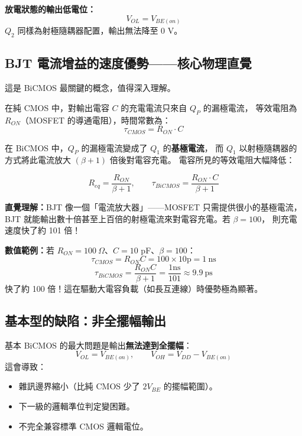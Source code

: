 \documentclass[12pt]{article}
\begin{document}
\begin{formulabox}
\textbf{放電狀態的輸出低電位：}
\[
V_{OL} = V_{BE(on)}
\]
$Q_2$ 同樣為射極隨耦器配置，輸出無法降至 0 V。
\end{formulabox}

\subsection*{BJT 電流增益的速度優勢——核心物理直覺}

\begin{keybox}
這是 BiCMOS 最關鍵的概念，值得深入理解。

在純 CMOS 中，對輸出電容 $C$ 的充電電流只來自 $Q_P$ 的漏極電流，
等效電阻為 $R_{ON}$（MOSFET 的導通電阻），時間常數為：
\[
\tau_{CMOS} = R_{ON} \cdot C
\]

在 BiCMOS 中，$Q_P$ 的漏極電流變成了 $Q_1$ 的\textbf{基極電流}，
而 $Q_1$ 以射極隨耦器的方式將此電流放大 $(\beta+1)$ 倍後對電容充電。
電容所見的等效電阻大幅降低：

\begin{formulabox}
\[
R_{eq} = \frac{R_{ON}}{\beta+1},\qquad
\tau_{BiCMOS} = \frac{R_{ON} \cdot C}{\beta+1}
\]
\end{formulabox}

\textbf{直覺理解：}BJT 像一個「電流放大器」——MOSFET 只需提供很小的基極電流，
BJT 就能輸出數十倍甚至上百倍的射極電流來對電容充電。若 $\beta = 100$，
則充電速度快了約 101 倍！

\textbf{數值範例：}若 $R_{ON} = 100\ \Omega$、$C = 10$ pF、$\beta = 100$：
\[
\tau_{CMOS} = R_{ON}C = 100 \times 10\text{p} = 1\ \text{ns}
\]
\[
\tau_{BiCMOS} = \frac{R_{ON}C}{\beta+1} = \frac{1\text{ns}}{101} \approx 9.9\ \text{ps}
\]
快了約 100 倍！這在驅動大電容負載（如長互連線）時優勢極為顯著。
\end{keybox}

\subsection*{基本型的缺陷：非全擺幅輸出}

基本 BiCMOS 的最大問題是輸出\textbf{無法達到全擺幅}：
\[
V_{OL} = V_{BE(on)},\qquad V_{OH} = V_{DD} - V_{BE(on)}
\]
這會導致：
\begin{itemize}[leftmargin=2em,itemsep=2pt]
\item 雜訊邊界縮小（比純 CMOS 少了 $2V_{BE}$ 的擺幅範圍）。
\item 下一級的邏輯準位判定變困難。
\item 不完全兼容標準 CMOS 邏輯電位。
\end{itemize}
\end{document}
